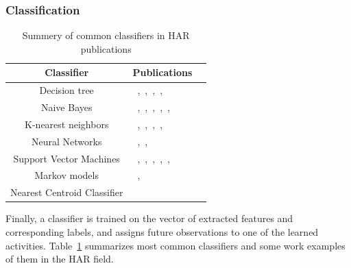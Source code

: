 \subsubsection{Classification}

\begin{table}[h]
    \centering
\begin{tabular}{|c|>{\centering}m{8cm}|>{\centering}m{5cm}|}
\hline 
Classifier & Publications\tabularnewline
\hline 
\hline 
Decision tree &  ~\citep{banos2014window},~\citep{4650398},~\citep{inproceedings},~\citep{Bao2004ActivityRF},~\citep{4650199}\tabularnewline
\hline 
Naive Bayes &~\citep{banos2014window},~\citep{tapia2007real},~\citep{bao2004activity},~\citep{6181018},~\citep{kern2003multi},~\citep{ravi2005activity}\tabularnewline
\hline 
K-nearest neighbors &~\citep{banos2014window},~\citep{4650398},~\citep{inproceedings},~\citep{maurer2006activity},~\citep{ravi2005activity}\tabularnewline
\hline 
Neural Networks &~\citep{8767219},~\citep{al2019deep},~\citep{Wang2018DeepLF}\tabularnewline
\hline 
Support Vector Machines &~\citep{morris2014recofit},~\citep{4620779},~\citep{Wang2018DeepLF},~\citep{4761688},~\citep{Huynh2007ScalableRO},\citep{zhang2011feature}\tabularnewline
\hline 
Markov models &~\citep{Vinh:2011:SCR:2036609.2036624},~\citep{5152756}\tabularnewline
\hline 
Nearest Centroid Classifier &~\citep{huynh2005analyzing}\tabularnewline
\hline 
\end{tabular}
    \caption{Summery of common classifiers in HAR publications }
    \label{tab:classifiers}
\end{table}


Finally, a classifier is trained on the vector of extracted features and corresponding 
labels, and assigns future 
observations to one of the learned activities. Table~\ref{tab:classifiers} summarizes most common classifiers and some work examples of them in the HAR field.  


